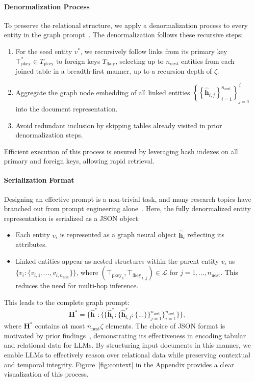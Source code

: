 \documentclass[11pt]{article}
\begin{document}
\paragraph{Denormalization Process}
To preserve the relational structure, we apply a denormalization process to every entity in the graph prompt~\citep{wydmuch2024tackling}. The denormalization follows these recursive steps:
\begin{enumerate}
    \item For the seed entity $v^*$, we recursively follow links from its primary key $\top^*_{\text{pkey}}\in T_{\text{pkey}}$ to foreign keys $T_{\text{fkey}}$, selecting up to $n_{\text{nest}}$ entities from each joined table in a breadth-first manner, up to a recursion depth of $\zeta$.
    \item Aggregate the graph node embedding of all linked entities $\left\{\left\{\hat{\mathbf{h}}_{i,j}\right\}_{i=1}^{n_{\text{nest}}}\right\}_{j=1}^{\zeta}$ into the document representation.
    \item Avoid redundant inclusion by skipping tables already visited in prior denormalization steps.
\end{enumerate}
Efficient execution of this process is ensured by leveraging hash indexes on all primary and foreign keys, allowing rapid retrieval.

\paragraph{Serialization Format}
Designing an effective prompt is a non-trivial task, and many research topics have branched out from prompt engineering alone~\citep{fang2024large}. Here, the fully denormalized entity representation is serialized as a JSON object:
\begin{itemize}
    \item Each entity $v_i$ is represented as a graph neural object $\hat{\mathbf{h}}_i$ reflecting its attributes.
    \item Linked entities appear as nested structures within the parent entity $v_i$ as $\{v_i:\{v_{i,1},...,v_{i,n_{\text{nest}}}\}\}$, where $({\top_{\text{pkey}}}_i, {\top_{\text{fkey}}}_{i,j})\in\mathcal{L}$ for $j=1,...,n_{\text{nest}}$. This reduces the need for multi-hop inference.
\end{itemize}
This leads to the complete graph prompt:
\begin{equation}
    \mathbf{H}^* = \{\hat{\mathbf{h}}^*:\{\{\hat{\mathbf{h}}_{i}^*: \{\hat{\mathbf{h}}_{i,j}^*: \{...\}\}_{j=1}^{n_{\text{nest}}}\}_{i=1}^{n_{\text{nest}}}\}\},
\end{equation}
where $\mathbf{H}^*$ contains at most $n_{\text{nest}}\zeta$ elements.
The choice of JSON format is motivated by prior findings~\citep{singha2023tabular}, demonstrating its effectiveness in encoding tabular and relational data for LLMs. By structuring input documents in this manner, we enable LLMs to effectively reason over relational data while preserving contextual and temporal integrity. Figure~\ref{fig:context}  in the Appendix provides a clear visualization of this process.
\end{document}
